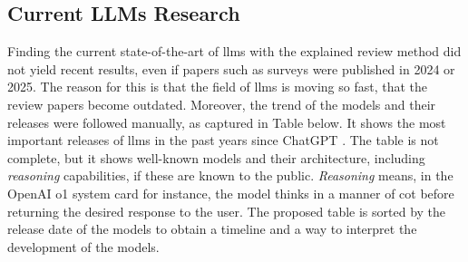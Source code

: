 \subsection{Current LLMs Research}

\hspace{1.5em} Finding the current state-of-the-art of \ac{llms} with the explained review method did not yield recent results, even if papers such as surveys were published in 2024 or 2025. The reason for this is that the field of \ac{llms} is moving so fast, that the review papers become outdated. Moreover, the trend of the models and their releases were followed manually, as captured in Table  below. It shows the most important releases of \ac{llms} in the past years since ChatGPT \cite{openai_introducing_2022}. The table is not complete, but it shows well-known models and their architecture, including \textit{reasoning} capabilities, if these are known to the public. \textit{Reasoning} means, in the OpenAI o1 system card \cite{openai_openai_2024-1} for instance, the model thinks in a manner of \ac{cot} before returning the desired response to the user. The proposed table is sorted by the release date of the models to obtain a timeline and a way to interpret the development of the models.

